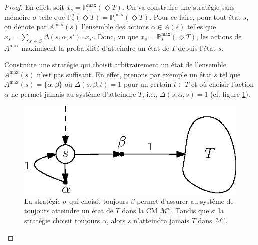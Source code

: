 \documentclass[12pt,a4paper]{report}
\theoremstyle{definition}%
\theoremstyle{remark}
\newcommand{\pr}{\mathbb{P}}
\begin{document}
\begin{proof}
	En effet, soit $x_s = \pr^{\max}_s(\Diamond T)$. On va construire une
	stratégie sans mémoire $\sigma$ telle que
	$\pr^\sigma_s(\Diamond T) = \pr^{\max}_s(\Diamond T)$.
	Pour ce faire, pour tout état $s$, on dénote par $A^{\max}(s)$ l'ensemble des
	actions $\alpha \in A(s)$ telles que
	$
		x_s = \sum_{s' \in S} \Delta(s, \alpha, s') \cdot x_{s'}
	$. Donc, vu que $x_s = \pr^{\max}_s(\Diamond T)$, les actions de $A^{\max}$
	maximisent la probabilité d'atteindre un état de $T$ depuis l'état $s$.
	\par Construire une stratégie qui choisit arbitrairement un état de l'ensemble
	$A^{\max}(s)$ n'est pas suffisant. En effet, prenons par exemple un état $s$
	tel que $A^{\max}(s) = \{\alpha, \beta\}$ où $\Delta(s, \beta, t) = 1$ pour un
	certain $t \in T$ et où choisir l'action $\alpha$ ne permet jamais au système
	d'atteindre $T$, i.e., $\Delta(s, \alpha, s) = 1$ (cf. figure
	\ref{accessibilite-preuve-strat}).

	\begin{figure}[H]
		\center
		\captionsetup{justification=centering}
		\includegraphics{figures/accessibilite-preuve}
		\caption{La stratégie $\sigma$ qui choisit toujours $\beta$ permet
			d'assurer au système de toujours atteindre un état de $T$ dans la CM
			$\mathcal{M}^\sigma$. Tandis que si la stratégie choisit
			toujours $\alpha$, alors $s$ n'atteindra jamais
			$T$ dans $\mathcal{M}^\sigma$.}
			\label{accessibilite-preuve-strat}
	\end{figure}


\end{proof}
\end{document}

